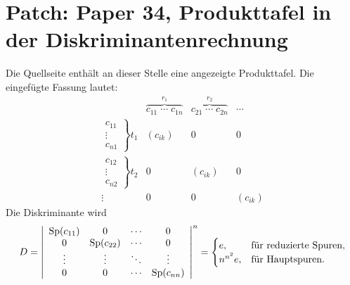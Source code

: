 \documentclass[11pt]{article}
\begin{document}
\section*{Patch: Paper 34, Produkttafel in der Diskriminantenrechnung}

Die Quellseite enthält an dieser Stelle eine angezeigte Produkttafel. Die eingefügte Fassung lautet:
\[
\begin{array}{c|ccc}
& \overbrace{c_{11}\;\cdots\;c_{1n}}^{r_1}
& \overbrace{c_{21}\;\cdots\;c_{2n}}^{r_2}
& \cdots \\ \hline
\left.\begin{array}{c}c_{11}\\[-1mm]\vdots\\[-1mm]c_{n1}\end{array}\right\}t_1
& (c_{ik}) & 0 & 0 \\[1.3em]
\left.\begin{array}{c}c_{12}\\[-1mm]\vdots\\[-1mm]c_{n2}\end{array}\right\}t_2
& 0 & (c_{ik}) & 0 \\[1.3em]
\vdots & 0 & 0 & (c_{ik})
\end{array}
\]
Die Diskriminante wird
\[
        D=\left|\begin{array}{cccc}
        \operatorname{Sp}(c_{11})&0&\cdots&0\\
        0&\operatorname{Sp}(c_{22})&\cdots&0\\
        \vdots&\vdots&\ddots&\vdots\\
        0&0&\cdots&\operatorname{Sp}(c_{nn})
        \end{array}\right|^{n}
        =\begin{cases}
        e, & \hbox{für reduzierte Spuren},\\
        n^{n^2}e, & \hbox{für Hauptspuren}.
        \end{cases}
\]
\end{document}
